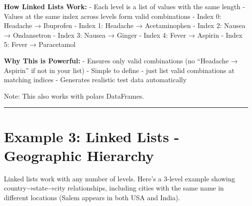\documentclass[
  letterpaper,
]{scrbook}
\begin{document}
\textbf{How Linked Lists Work:} - Each level is a list of values with
the same length - Values at the same index across levels form valid
combinations - Index 0: Headache → Ibuprofen - Index 1: Headache →
Acetaminophen - Index 2: Nausea → Ondansetron - Index 3: Nausea → Ginger
- Index 4: Fever → Aspirin - Index 5: Fever → Paracetamol

\textbf{Why This is Powerful:} - Ensures only valid combinations (no
``Headache → Aspirin'' if not in your list) - Simple to define - just
list valid combinations at matching indices - Generates realistic test
data automatically

Note: This also works with polars DataFrames.

\begin{center}\rule{0.5\linewidth}{0.5pt}\end{center}

\section{Example 3: Linked Lists - Geographic
Hierarchy}\label{example-3-linked-lists---geographic-hierarchy}

Linked lists work with any number of levels. Here's a 3-level example
showing country→state→city relationships, including cities with the same
name in different locations (Salem appears in both USA and India).
\end{document}
